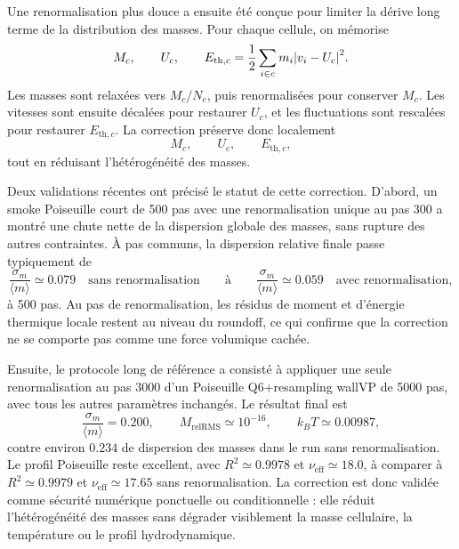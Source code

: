\documentclass[11pt,a4paper]{article}
\begin{document}
Une renormalisation plus douce a ensuite été conçue pour limiter la dérive long terme de la distribution des masses. Pour chaque cellule, on mémorise
\begin{equation}
  M_c,
  \qquad
  U_c,
  \qquad
  E_{\mathrm{th},c}=\frac12\sum_{i\in c}m_i\abs{v_i-U_c}^2.
\end{equation}
Les masses sont relaxées vers $M_c/N_c$, puis renormalisées pour conserver $M_c$. Les vitesses sont ensuite décalées pour restaurer $U_c$, et les fluctuations sont rescalées pour restaurer $E_{\mathrm{th},c}$. La correction préserve donc localement
\begin{equation}
  M_c,
  \qquad
  U_c,
  \qquad
  E_{\mathrm{th},c},
\end{equation}
tout en réduisant l'hétérogénéité des masses.

Deux validations récentes ont précisé le statut de cette correction. D'abord, un smoke Poiseuille court de 500 pas avec une renormalisation unique au pas 300 a montré une chute nette de la dispersion globale des masses, sans rupture des autres contraintes. À pas communs, la dispersion relative finale passe typiquement de
\begin{equation}
  \frac{\sigma_m}{\langle m\rangle}\simeq 0.079
  \quad\text{sans renormalisation}
  \qquad \text{à} \qquad
  \frac{\sigma_m}{\langle m\rangle}\simeq 0.059
  \quad\text{avec renormalisation},
\end{equation}
à 500 pas. Au pas de renormalisation, les résidus de moment et d'énergie thermique locale restent au niveau du roundoff, ce qui confirme que la correction ne se comporte pas comme une force volumique cachée.

Ensuite, le protocole long de référence a consisté à appliquer une seule renormalisation au pas 3000 d'un Poiseuille Q6+resampling wallVP de 5000 pas, avec tous les autres paramètres inchangés. Le résultat final est
\begin{equation}
  \frac{\sigma_m}{\langle m\rangle}=0.200,
  \qquad
  M_{\mathrm{relRMS}}\simeq 10^{-16},
  \qquad
  k_BT\simeq 0.00987,
\end{equation}
contre environ $0.234$ de dispersion des masses dans le run sans renormalisation. Le profil Poiseuille reste excellent, avec $R^2\simeq0.9978$ et $\nu_{\mathrm{eff}}\simeq18.0$, à comparer à $R^2\simeq0.9979$ et $\nu_{\mathrm{eff}}\simeq17.65$ sans renormalisation. La correction est donc validée comme sécurité numérique ponctuelle ou conditionnelle : elle réduit l'hétérogénéité des masses sans dégrader visiblement la masse cellulaire, la température ou le profil hydrodynamique.
\end{document}
